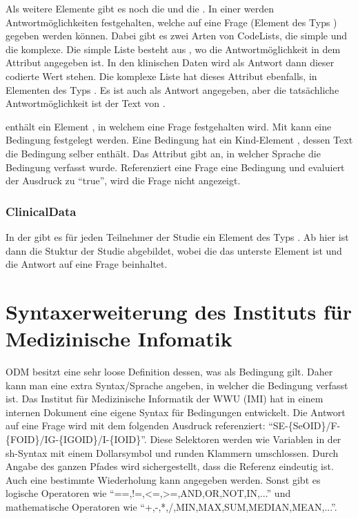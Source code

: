 Als weitere Elemente gibt es noch die  und die .
In einer  werden Antwortmöglichkeiten festgehalten, welche auf eine Frage (Element des Typs ) gegeben werden können.
Dabei gibt es zwei Arten von CodeLists, die simple und die komplexe.
Die simple Liste besteht aus , wo die Antwortmöglichkeit in dem Attribut  angegeben ist.
In den klinischen Daten wird als Antwort dann dieser codierte Wert stehen.
Die komplexe Liste hat dieses Attribut ebenfalls, in Elementen des Typs . Es ist auch als Antwort angegeben, aber die tatsächliche Antwortmöglichkeit ist der Text von .

 enthält ein Element , in welchem eine Frage festgehalten wird.
Mit  kann eine Bedingung festgelegt werden.
Eine Bedingung hat ein Kind-Element , dessen Text die Bedingung selber enthält.
Das Attribut  gibt an, in welcher Sprache die Bedingung verfasst wurde.
Referenziert eine Frage eine Bedingung und evaluiert der Ausdruck zu \enquote{true}, wird die Frage nicht angezeigt.

\subsubsection{ClinicalData}

In der  gibt es für jeden Teilnehmer der Studie ein Element des Typs .
Ab hier ist dann die Stuktur der Studie abgebildet, wobei die  das unterste Element ist und die Antwort auf eine Frage beinhaltet.

\section{Syntaxerweiterung des Instituts für Medizinische Infomatik}

ODM besitzt eine sehr loose Definition dessen, was als Bedingung gilt. Daher kann man eine extra Syntax/Sprache angeben, in welcher die Bedingung verfasst ist.
Das Institut für Medizinische Informatik der WWU (IMI) hat in einem internen Dokument eine eigene Syntax für Bedingungen entwickelt.
Die Antwort auf eine Frage wird mit dem folgenden Ausdruck referenziert: \enquote{SE-\{SeOID\}/F-\{FOID\}/IG-\{IGOID\}/I-\{IOID\}}.
Diese Selektoren werden wie Variablen in der sh-Syntax mit einem Dollarsymbol und runden Klammern umschlossen.
Durch Angabe des ganzen Pfades wird sichergestellt, dass die Referenz eindeutig ist. Auch eine bestimmte Wiederholung kann angegeben werden.
Sonst gibt es logische Operatoren wie \enquote{==,!=,<=,>=,AND,OR,NOT,IN,...} und mathematische Operatoren wie \enquote{+,-,*,/,MIN,MAX,SUM,MEDIAN,MEAN,...}.

